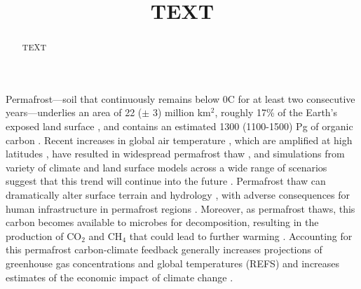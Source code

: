 \documentclass[essd, manuscript]{copernicus}
\begin{document}
\title{TEXT}








\received{}
\pubdiscuss{} %
\revised{}
\accepted{}
\published{}




\maketitle



\begin{abstract}
TEXT
\end{abstract}




\introduction
Permafrost---soil that continuously remains below 0\degree C for at least two consecutive years---underlies an area of 22 ($\pm$ 3) million km$^2$, roughly 17\% of the Earth's exposed land surface \citep{gruber_2012_derivation}, and contains an estimated 1300 (1100-1500) Pg of organic carbon \citep{hugelius_2014_estimated}.
Recent increases in global air temperature \citep{ipcc_ar5_wg1}, which are amplified at high latitudes \citep{pithan_2014_arctic}, have resulted in widespread permafrost thaw \citep{romanovsky_2010_permafrost}, and simulations from variety of climate and land surface models across a wide range of scenarios suggest that this trend will continue into the future \citep{koven_2013_analysis; chadburn_2017_observation}.
Permafrost thaw can dramatically alter surface terrain and hydrology \citep{jones_2013_quantifying; godin_2014_effects; necsoiu_2013_multitemporal}, with adverse consequences for human infrastructure in permafrost regions \citep{anisimov_1997_permafrost; nelson_2002_climate; larsen_2008_estimating}.
Moreover, as permafrost thaws, this carbon becomes available to microbes for decomposition, resulting in the production of CO$_2$ and CH$_4$ \citep{brown_2008_report; romanovsky_2010_thermal; bond-lamberty_2016_temperature} that could lead to further warming \citep{koven_2011_permafrost; schuur_2015_climate}. Accounting for this permafrost carbon-climate feedback generally increases projections of greenhouse gas concentrations and global temperatures (REFS) and increases estimates of the economic impact of climate change \citep{hope_2015_economic; yumashev_2019_climate; chen_2019_economic}.
\end{document}
